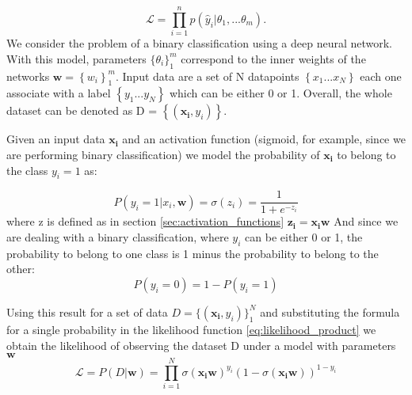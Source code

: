 \documentclass[11pt]{report}
\begin{document}
\begin{equation}\label{eq:likelihood_product}
\mathcal{L} =\prod_{i=1}^n p(\hat y_i|\theta_1, ...\theta_m).
\end{equation}
We consider the problem of a binary classification using a deep neural network.
With this model, parameters $\{\theta_i \}_1 ^m$ correspond to the inner weights of the networks $\mathbf{w} = \left\{w_i \right\}_1^m$.
Input data are a set of N datapoints $\left\{ x_1 ... x_N\right\}$ each one associate with a label  $\left\{ y_1 ... y_N\right\}$ which can be either 0 or 1.
Overall, the whole dataset can be denoted as D = $\left\{ (\mathbf{x_i}, y_i)\right\}$.

Given an input data $\mathbf{x_i}$  and an activation function (sigmoid, for example, since we are performing binary classification)
we model the probability of $\mathbf{x_i}$ to belong to the class $y_i = 1$ as:

\begin{equation}
 P(y_i = 1 | x_i, \mathbf{w}) = \sigma(z_i) = \frac{1}{1+e^{-z_i}}
\end{equation}
where z is defined as in section \ref{sec:activation_functions} $\mathbf{z_i} = \mathbf{x_i}\mathbf{w}$
And since we are dealing with a binary classification, where $y_i$ can be either 0 or 1, the probability to belong to one class is 1 minus the probability to belong to the other:
\begin{equation}
P(y_i = 0) = 1 - P(y_i = 1)
\end{equation}

Using this result for a set of data $D = \{ (\mathbf{x_i}, y_i)\}_1 ^N$ and substituting the formula for a single probability in the likelihood function \ref{eq:likelihood_product} we obtain the likelihood of observing the dataset D under a model with parameters $\mathbf{w}$
\begin{equation}\label{eq:like_no_log}
\mathcal{L} = P(D|\mathbf{w}) = \prod_{i=1}^N \sigma(\mathbf{x_i w})^{y_i} (1-\sigma(\mathbf{x_i w}))^{1-y_i}
\end{equation}
\end{document}
